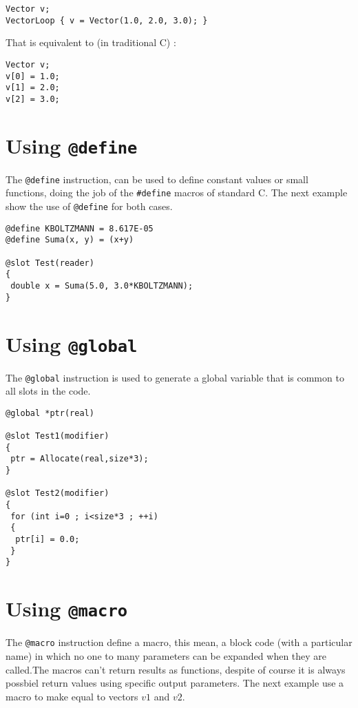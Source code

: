 \documentclass[a4paper,12pt]{article}
\begin{document}
\lstset{language=C}
\begin{lstlisting}
Vector v;
VectorLoop { v = Vector(1.0, 2.0, 3.0); }
\end{lstlisting}

\noindent
That is equivalent to (in traditional C) :

\lstset{language=C}
\begin{lstlisting}
Vector v;
v[0] = 1.0;
v[1] = 2.0;
v[2] = 3.0;
\end{lstlisting}

\section{Using \texttt{@define}}

The \verb'@define' instruction, can be used to define constant values or
small functions, doing the job of the \verb'#define' macros of standard C.
The next example show the use of \verb'@define' for both cases.

\lstset{language=C}
\begin{lstlisting}
@define KBOLTZMANN = 8.617E-05
@define Suma(x, y) = (x+y)

@slot Test(reader)
{
 double x = Suma(5.0, 3.0*KBOLTZMANN);
}
\end{lstlisting}

\section{Using \texttt{@global}}

The \verb'@global' instruction is used to generate a global variable that is
common to all slots in the code.

\lstset{language=C}
\begin{lstlisting}
@global *ptr(real)

@slot Test1(modifier)
{
 ptr = Allocate(real,size*3);
}

@slot Test2(modifier)
{
 for (int i=0 ; i<size*3 ; ++i)
 {
  ptr[i] = 0.0;
 }
} 
\end{lstlisting}


\section{Using \texttt{@macro}}

The \verb'@macro' instruction define a macro, this mean, a block code (with a
particular name) in which no one to many parameters can be expanded when they
are called.The macros can't return results as functions, despite of course it
is always possbiel return values using specific output parameters. The next
example use a macro to make equal to vectors $v1$ and $v2$.
\end{document}
